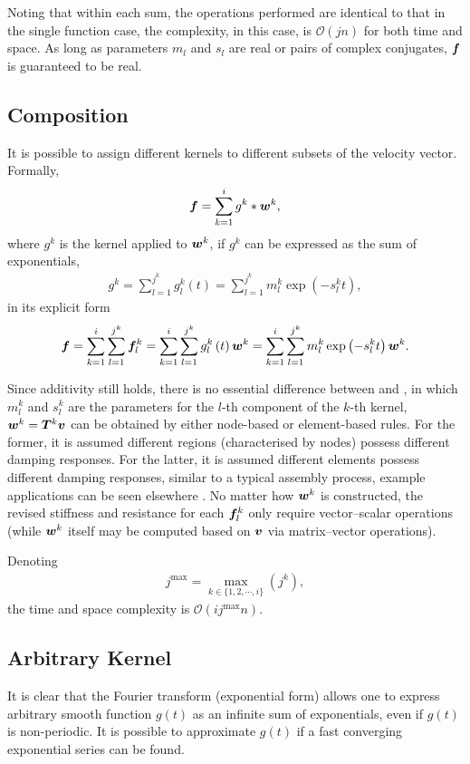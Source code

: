 Noting that within each sum, the operations performed are identical to that in the single function case, the complexity, in this case, is $\mathcal{O}\left(jn\right)$ for both time and space. As long as parameters $m_l$ and $s_l$ are real or pairs of complex conjugates, $\bm{f}$ is guaranteed to be real.
\subsection{Composition}
It is possible to assign different kernels to different subsets of the velocity vector. Formally,
\begin{gather}
\bm{f}=\sum_{k=1}^{i}g^k*\bm{w}^k,
\end{gather}
where $g^k$ is the kernel applied to $\bm{w}^k$, if $g^k$ can be expressed as the sum of exponentials,
\begin{gather}
g^k=\sum_{l=1}^{j^k}g_l^k\left(t\right)=\sum_{l=1}^{j^k}m_l^k\exp\left(-s_l^kt\right),
\end{gather}
in its explicit form
\begin{gather}\label{eq:composition}
\bm{f}=\sum_{k=1}^{i}\sum_{l=1}^{j^k}\bm{f}_l^k=\sum_{k=1}^{i}\sum_{l=1}^{j^k}g_l^k\left(t\right)\bm{w}^k=\sum_{k=1}^{i}\sum_{l=1}^{j^k}m_l^k\exp\left(-s_l^kt\right)\bm{w}^k.
\end{gather}

Since additivity still holds, there is no essential difference between  and , in which $m_l^k$ and $s_l^k$ are the parameters for the $l$-th component of the $k$-th kernel, $\bm{w}^k=\bm{T}^k\bm{v}$ can be obtained by either node-based or element-based rules. For the former, it is assumed different regions (characterised by nodes) possess different damping responses. For the latter, it is assumed different elements possess different damping responses, similar to a typical assembly process, example applications can be seen elsewhere \citep{Friswell2007}. No matter how $\bm{w}^k$ is constructed, the revised stiffness and resistance for each $\bm{f}_l^k$ only require vector--scalar operations (while $\bm{w}^k$ itself may be computed based on $\bm{v}$ via matrix--vector operations).

Denoting
\begin{gather}
j^\text{max}=\max_{k\in\{1,2,\cdots,i\}}\left(j^k\right),
\end{gather}
the time and space complexity is $\mathcal{O}\left(ij^\text{max}n\right)$.
\subsection{Arbitrary Kernel}
It is clear that the Fourier transform (exponential form) allows one to express arbitrary smooth function $g\left(t\right)$ as an infinite sum of exponentials, even if $g\left(t\right)$ is non-periodic. It is possible to approximate $g\left(t\right)$ if a fast converging exponential series can be found.

